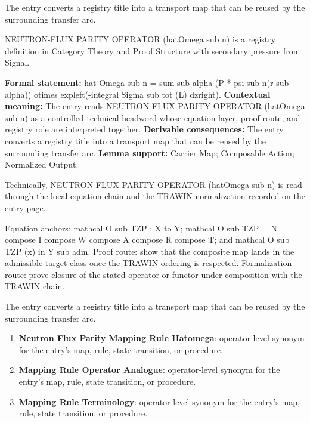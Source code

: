 The entry converts a registry title into a transport map that can be reused by the surrounding transfer arc.
\clearpage


\begingroup\small
{}
NEUTRON-FLUX PARITY OPERATOR (hatOmega sub n) is a registry definition in Category Theory and Proof Structure with secondary pressure from Signal.

\begingroup\footnotesize\setlength{\emergencystretch}{3em}\sloppy
\textbf{Formal statement:} hat Omega sub n = sum sub alpha (P * psi sub n(r sub alpha)) otimes expleft(-integral Sigma sub tot (L) dzright). \textbf{Contextual meaning:} The entry reads NEUTRON-FLUX PARITY OPERATOR (hatOmega sub n) as a controlled technical headword whose equation layer, proof route, and registry role are interpreted together. \textbf{Derivable consequences:} The entry converts a registry title into a transport map that can be reused by the surrounding transfer arc. \textbf{Lemma support:} Carrier Map; Composable Action; Normalized Output.\par
\endgroup

Technically, NEUTRON-FLUX PARITY OPERATOR (hatOmega sub n) is read through the local equation chain and the TRAWIN normalization recorded on the entry page.

Equation anchors: mathcal O sub TZP : X to Y; mathcal O sub TZP = N compose I compose W compose A compose R compose T; and mathcal O sub TZP (x) in Y sub adm. Proof route: show that the composite map lands in the admissible target class once the TRAWIN ordering is respected. Formalization route: prove closure of the stated operator or functor under composition with the TRAWIN chain.

The entry converts a registry title into a transport map that can be reused by the surrounding transfer arc.
\endgroup

\begin{enumerate}[leftmargin=1.6em,itemsep=6pt,topsep=4pt]
\item \textbf{Neutron Flux Parity Mapping Rule Hatomega}: operator-level synonym for the entry's map, rule, state transition, or procedure.
\item \textbf{Mapping Rule Operator Analogue}: operator-level synonym for the entry's map, rule, state transition, or procedure.
\item \textbf{Mapping Rule Terminology}: operator-level synonym for the entry's map, rule, state transition, or procedure.
\end{enumerate}

